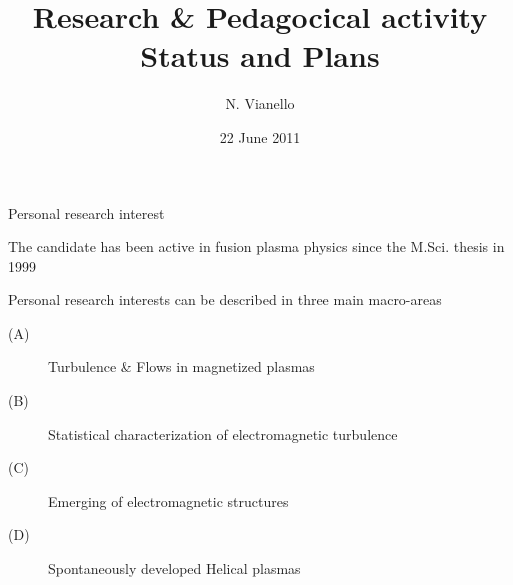 \documentclass[t,10pt]{beamer}
\title{Research \& Pedagocical activity \\
{\small Status and Plans}}
\author{N. Vianello }
\date{22 June 2011}
\begin{document}
\begin{titleframe}
\end{titleframe}

\begin{frame}{Personal research interest}
\begin{itemize}
{\large\item The candidate has been active in fusion plasma physics since the
M.Sci. thesis in 1999
\item Personal research interests can be described in three main
  macro-areas
\begin{description}
\item[(A)] \textcolor{taorange}{Turbulence \& Flows in magnetized plasmas}
\item[(B)] \textcolor{ta3skyblue}{Statistical characterization of electromagnetic turbulence}
\item[(C)]\textcolor{ta3chameleon}{Emerging of electromagnetic structures}
\item[(D)] \textcolor{tascarletred}{Spontaneously developed Helical plasmas}
\end{description}
}\end{itemize}
\end{frame}
\end{document}
